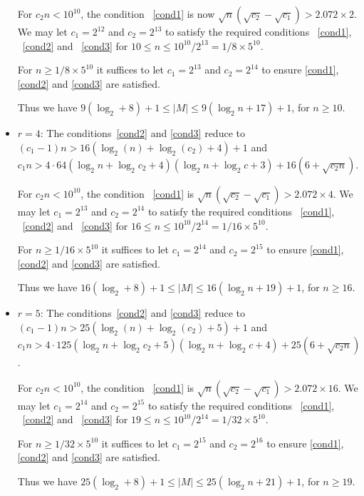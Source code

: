\begin{itemize}
For $c_2n < 10^{10}$, the condition ~\eqref{cond1} is now
$\sqrt{n}(\sqrt{c_2}-\sqrt{c_1})> 2.072\times2$. We may let
$c_1=2^{12}$ and $c_2=2^{13}$ to satisfy the required conditions
~\eqref{cond1}, ~\eqref{cond2} and ~\eqref{cond3} for $10 \leq n\leq
10^{10}/2^{13}=1/8\times 5^{10}$.

For $n \geq 1/8\times 5^{10}$ it suffices to let $c_1=2^{13}$ and
$c_2=2^{14}$ to ensure \eqref{cond1}, \eqref{cond2} and
\eqref{cond3} are satisfied.

Thus we have $9(\log_2 +8)+1 \leq |M| \leq 9(\log_2n+17)+1$, for
$n\geq 10$.

\item $r=4$: The conditions~\eqref{cond2} and \eqref{cond3} reduce
 to $(c_1-1)n >16(
\log_2(n)+\log_2(c_2)+4)+1$ and $c_1n > 4\cdot64(\log_2 n+ \log_2
c_2+4)(\log_2n+\log_2 c+3)+16(6+\sqrt{c_2n})$.

For $c_2n < 10^{10}$, the condition ~\eqref{cond1} is
$\sqrt{n}(\sqrt{c_2}-\sqrt{c_1})> 2.072\times4$. We may let
$c_1=2^{13}$ and $c_2=2^{14}$ to satisfy the required conditions
~\eqref{cond1}, ~\eqref{cond2} and ~\eqref{cond3} for $16 \leq n\leq
10^{10}/2^{14}=1/{16}\times 5^{10}$.

For $n \geq 1/16\times 5^{10}$ it suffices to let $c_1=2^{14}$ and
$c_2=2^{15}$ to ensure \eqref{cond1}, \eqref{cond2} and
\eqref{cond3} are satisfied.

Thus we have $16(\log_2 +8)+1 \leq |M| \leq 16(\log_2n+19)+1$, for
$n\geq 16$.

\item $r=5$: The conditions~\eqref{cond2} and \eqref{cond3} reduce
 to $(c_1-1)n >25(
\log_2(n)+\log_2(c_2)+5)+1$ and $c_1n > 4\cdot125(\log_2 n+ \log_2
c_2+5)(\log_2n+\log_2 c+4)+25(6+\sqrt{c_2n})$.

For $c_2n < 10^{10}$, the condition ~\eqref{cond1} is
$\sqrt{n}(\sqrt{c_2}-\sqrt{c_1})> 2.072\times 16$. We may let
$c_1=2^{14}$ and $c_2=2^{15}$ to satisfy the required conditions
~\eqref{cond1}, ~\eqref{cond2} and ~\eqref{cond3} for $19 \leq n\leq
10^{10}/2^{14}=1/{32}\times 5^{10}$.

For $n \geq 1/32\times 5^{10}$ it suffices to let $c_1=2^{15}$ and
$c_2=2^{16}$ to ensure \eqref{cond1}, \eqref{cond2} and
\eqref{cond3} are satisfied.

Thus we have $25(\log_2 +8)+1 \leq |M| \leq 25(\log_2n+21)+1$, for
$n\geq 19$.


\end{itemize}



